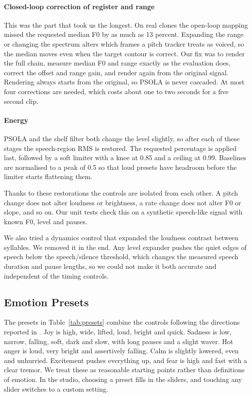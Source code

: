 \documentclass[conference]{IEEEtran}
\begin{document}
\paragraph{Closed-loop correction of register and range} This was the part that took us the
longest. On real clones the open-loop mapping missed the requested median F0 by as much as 13
percent. Expanding the range or changing the spectrum alters which frames a pitch tracker treats
as voiced, so the median moves even when the target contour is correct. Our fix was to render the
full chain, measure median F0 and range exactly as the evaluation does, correct the offset and
range gain, and render again from the original signal. Rendering always starts from the original,
so PSOLA is never cascaded. At most four corrections are needed, which costs about one to two
seconds for a five second clip.

\paragraph{Energy} PSOLA and the shelf filter both change the level slightly, so after each of
these stages the speech-region RMS is restored. The requested percentage is applied last, followed
by a soft limiter with a knee at 0.85 and a ceiling at 0.99. Baselines are normalised to a peak of
0.5 so that loud presets have headroom before the limiter starts flattening them.

Thanks to these restorations the controls are isolated from each other. A pitch change does not
alter loudness or brightness, a rate change does not alter F0 or slope, and so on. Our unit tests
check this on a synthetic speech-like signal with known F0, level and pauses.

We also tried a dynamics control that expanded the loudness contrast between syllables. We removed
it in the end. Any level expander pushes the quiet edges of speech below the speech/silence
threshold, which changes the measured speech duration and pause lengths, so we could not make it
both accurate and independent of the timing controls.

\subsection{Emotion Presets}
The presets in Table~\ref{tab:presets} combine the controls following the directions reported in
\cite{b11,b12,b13}. Joy is high, wide, lifted, loud, bright and quick. Sadness is low, narrow,
falling, soft, dark and slow, with long pauses and a slight waver. Hot anger is loud, very bright
and assertively falling. Calm is slightly lowered, even and unhurried. Excitement pushes everything
up, and fear is high and fast with a clear tremor. We treat these as reasonable starting points
rather than definitions of emotion. In the studio, choosing a preset fills in the sliders, and
touching any slider switches to a custom setting.
\end{document}
